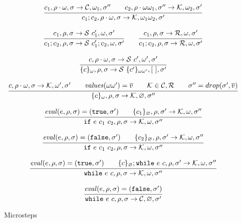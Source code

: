 \begin{figure}
$$\begin{array}{c}
      \\\\
      \cfrac{
        c_1, \rho \cdot \omega,\sigma \rightarrow {\mathcal{C}}, \omega_1,\sigma''\qquad
        c_2, \rho \cdot \omega\omega_1,\sigma'' \rightarrow \mathcal{K},\omega_2,\sigma'
      }{
        c_1;c_2,\rho \cdot \omega ,\sigma \rightarrow \mathcal{K},\omega_1\omega_2,\sigma'
      }
      \\\\
      \cfrac{
        c_1, \rho,\sigma\rightarrow {\mathcal{S}}~c_1', \omega,\sigma'
      }{
        c_1;c_2,\rho,\sigma \rightarrow {\mathcal{S}}~c_1';c_2,\omega,\sigma'
      }
      \qquad
      \cfrac{
        c_1, \rho,\sigma \rightarrow {\mathcal{R}}, \omega,\sigma'
      }{
        c_1;c_2,\rho,\sigma \rightarrow {\mathcal{R}},\omega,\sigma'
      }
      \\\\
      \cfrac{
      c, \rho \cdot \omega, \sigma \rightarrow {\mathcal{S}}~c', \omega', \sigma'
      }{
      \{c\}_{\omega},\rho, \sigma \rightarrow {\mathcal{S}}~\{c'\}_{\omega\omega'}, [~],\sigma'
      }
      \\\\
      \cfrac{
      c, \rho \cdot \omega, \sigma \rightarrow
      \mathcal{K}, \omega', \sigma' \qquad {\mathit{values}}(\omega\omega') = \overline{v}
      \qquad \mathcal{K} \in {\mathcal{C}},{\mathcal{R}} \qquad
      \sigma'' = drop(\sigma', \overline{v})
      }{
      \{c\}_{\omega},\rho, \sigma \rightarrow \mathcal{K}, \varnothing,\sigma''
      }
      \\\\
      \cfrac{
        {\mathit{eval}}(e,\rho,\sigma) = ({\tt{true}}, \sigma')
        \qquad \{c_1\}_\varnothing, \rho,\sigma' \rightarrow \mathcal{K},\omega,\sigma''
      }{
        {\tt{if}}~e~c_1~c_2,\rho,\sigma \rightarrow \mathcal{K},\omega,\sigma''
      }
      \\\\
      \cfrac{
        {\mathit{eval}}(e,\rho,\sigma) = ({\tt{false}}, \sigma') \qquad 
        \{c_2\}_\varnothing, \rho,\sigma' \rightarrow \mathcal{K},\omega,\sigma''
      }{
        {\tt{if}}~e~c_1~c_2,\rho,\sigma \rightarrow \mathcal{K},\omega,\sigma''
      }
      \\\\
      \cfrac{
        {\mathit{eval}}(e,\rho,\sigma) = ({\tt{true}}, \sigma') \qquad 
        \{c\}_\varnothing; {\tt{while}}~e~c,\rho,\sigma' \rightarrow \mathcal{K}, \omega,\sigma''
      }{
        {\tt{while}}~e~c, \rho, \sigma \rightarrow \mathcal{K},\omega,\sigma''
      }
      \\\\
      \cfrac{
        {\mathit{eval}}(e,\rho,\sigma) =({\tt{false}}, \sigma')
      }{
        {\tt{while}}~e~c, \rho, \sigma \rightarrow {\mathcal{C}},\varnothing,\sigma'
      }
    \end{array}
  $$
  \caption{Microsteps}
  \label{fig:sem1}
\end{figure}
